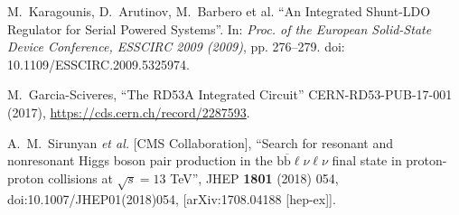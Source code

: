 \documentclass[a4paper,12pt,italian]{article}
\begin{document}
\begin{small}
\begin{thebibliography}{1}

 M.~Karagounis, D.~Arutinov, M.~Barbero et al. ``An Integrated Shunt-LDO Regulator for Serial Powered Systems''. In: \textit{Proc. of the European Solid-State Device Conference,
ESSCIRC 2009 (2009)}, pp. 276–279. doi: 10.1109/ESSCIRC.2009.5325974.

 M.~Garcia-Sciveres, ``The RD53A Integrated Circuit''
CERN-RD53-PUB-17-001 (2017), \url{https://cds.cern.ch/record/2287593}.

  A.~M.~Sirunyan {\it et al.} [CMS Collaboration], ``Search for resonant and nonresonant Higgs boson pair production in the $ \mathrm{b}\overline{\mathrm{b}}\mathit{\ell \nu \ell \nu } $ final state in proton-proton collisions at $ \sqrt{s}=13 $ TeV'',  JHEP {\bf 1801} (2018) 054,  doi:10.1007/JHEP01(2018)054, [arXiv:1708.04188 [hep-ex]].

\end{thebibliography}
\end{small}
\end{document}
